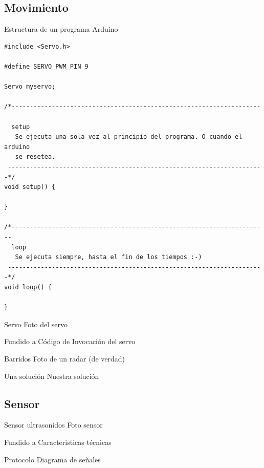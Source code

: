\documentclass{beamer}
\begin{document}
\subsection{Movimiento}

\begin{frame}[fragile]{Estructura de un programa Arduino}
\begin{lstlisting}
#include <Servo.h>     

#define SERVO_PWM_PIN 9

Servo myservo;         

/*----------------------------------------------------------------------
  setup
   Se ejecuta una sola vez al principio del programa. O cuando el arduino
   se resetea.
 ----------------------------------------------------------------------*/
void setup() {
  
}

/*----------------------------------------------------------------------
  loop
   Se ejecuta siempre, hasta el fin de los tiempos :-)
 ----------------------------------------------------------------------*/
void loop() {

}
\end{lstlisting}
\end{frame}

\begin{frame}{Servo}
  Foto del servo

  Fundido a Código de Invocación del servo
  
\end{frame}

\begin{frame}{Barridos}
  Foto de un radar (de verdad)
\end{frame}

\begin{frame}{Una solución}
  Nuestra solución
\end{frame}

\subsection{Sensor}

\begin{frame}{Sensor ultrasonidos}
  Foto sensor

  Fundido a Caracteristicas técnicas
\end{frame}

\begin{frame}{Protocolo}
  Diagrama de señales
\end{frame}
\end{document}
